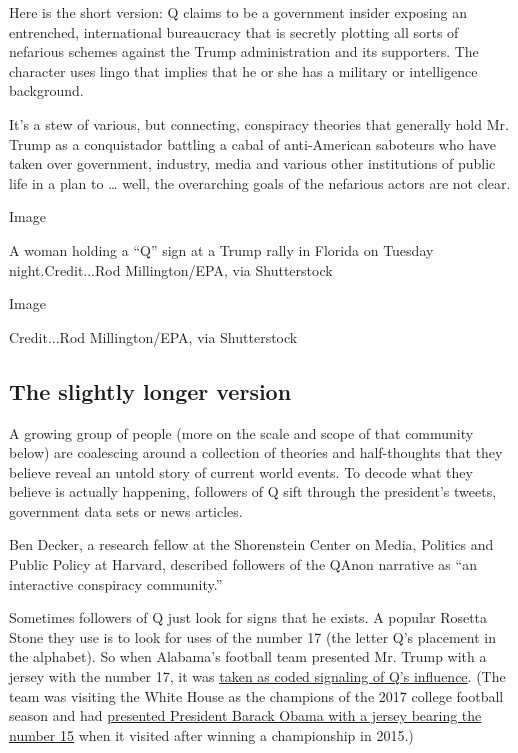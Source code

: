 Here is the short version: Q claims to be a government insider exposing
an entrenched, international bureaucracy that is secretly plotting all
sorts of nefarious schemes against the Trump administration and its
supporters. The character uses lingo that implies that he or she has a
military or intelligence background.

It's a stew of various, but connecting, conspiracy theories that
generally hold Mr. Trump as a conquistador battling a cabal of
anti-American saboteurs who have taken over government, industry, media
and various other institutions of public life in a plan to \ldots{}
well, the overarching goals of the nefarious actors are not clear.

Image

A woman holding a ``Q'' sign at a Trump rally in Florida on Tuesday
night.Credit...Rod Millington/EPA, via Shutterstock

Image

Credit...Rod Millington/EPA, via Shutterstock

\hypertarget{the-slightly-longer-version}{%
\subsection{The slightly longer
version}\label{the-slightly-longer-version}}

A growing group of people (more on the scale and scope of that community
below) are coalescing around a collection of theories and half-thoughts
that they believe reveal an untold story of current world events. To
decode what they believe is actually happening, followers of Q sift
through the president's tweets, government data sets or news articles.

Ben Decker, a research fellow at the Shorenstein Center on Media,
Politics and Public Policy at Harvard, described followers of the QAnon
narrative as ``an interactive conspiracy community.''

Sometimes followers of Q just look for signs that he exists. A popular
Rosetta Stone they use is to look for uses of the number 17 (the letter
Q's placement in the alphabet). So when Alabama's football team
presented Mr. Trump with a jersey with the number 17, it was
\href{https://www.reddit.com/r/greatawakening/comments/8bc0ft/why_does_he_keep_picking_17_for_jerseys_shouldnt/}{taken
as coded signaling of Q's influence}. (The team was visiting the White
House as the champions of the 2017 college football season and had
\href{https://detroit.cbslocal.com/2013/04/16/president-obama-expects-to-see-alabama-at-the-white-house-again/}{presented
President Barack Obama with a jersey bearing the number 15} when it
visited after winning a championship in 2015.)

